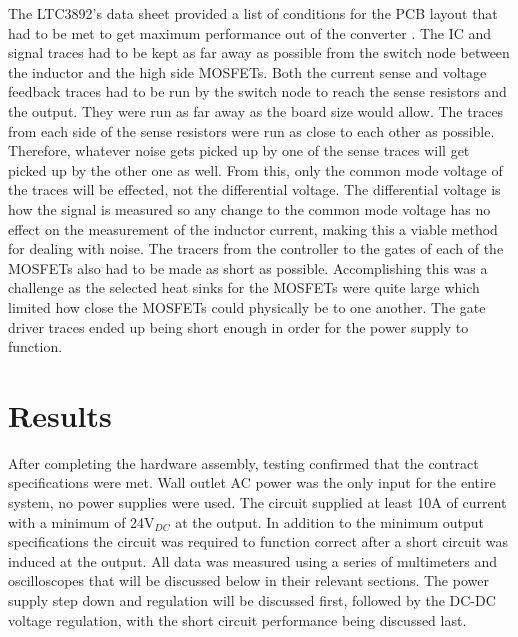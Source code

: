 \documentclass[11pt]{article}
\begin{document}
    \noindent The LTC3892's data sheet provided a list of conditions for the PCB layout that had to be met to get maximum performance out of the converter \cite{linear_technology_ltc3892:_nodate}. The IC and signal traces had to be kept as far away as possible from the switch node between the inductor and the high side MOSFETs. Both the current sense and voltage feedback traces had to be run by the switch node to reach the sense resistors and the output. They were run as far away as the board size would allow. The traces from each side of the sense resistors were run as close to each other as possible. Therefore, whatever noise gets picked up by one of the sense traces will get picked up by the other one as well. From this, only the common mode voltage of the traces will be effected, not the differential voltage. The differential voltage is how the signal is measured so any change to the common mode voltage has no effect on the measurement of the inductor current, making this a viable method for dealing with noise.  
    \newline
    \newline
    \noindent The tracers from the controller to the gates of each of the MOSFETs also had to be made as short as possible. Accomplishing this was a challenge as the selected heat sinks for the MOSFETs were quite large which limited how close the MOSFETs could physically be to one another. The gate driver traces ended up being short enough in order for the power supply to function.
    
\section{Results}
    After completing the hardware assembly, testing confirmed that the contract specifications were met. Wall outlet AC power was the only input for the entire system, no power supplies were used. The circuit supplied at least 10A of current with a minimum of 24V$_{DC}$ at the output. In addition to the minimum output specifications the circuit was required to function correct after a short circuit was induced at the output. All data was measured using a series of multimeters and oscilloscopes that will be discussed below in their relevant sections. The power supply step down and regulation will be discussed first, followed by the DC-DC voltage regulation, with the short circuit performance being discussed last. 
    
\end{document}
